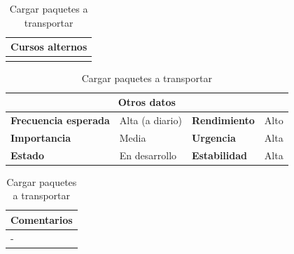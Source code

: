 \documentclass[12pt,spanish]{article}
\begin{document}
\begin{table}[H]
\vspace{1cm}

\begin{tabular}{|m{10pt}|m{7.15cm}|m{10pt}|m{7.15cm}|}
\hline
\multicolumn{4}{|m{16.2cm}|}{\textbf{Cursos alternos}} \\
\hline
\\
\hline

\end{tabular}

\vspace{1cm}

\begin{tabular}{|m{3.72cm}|m{3.72cm}|m{3.72cm}|m{3.72cm}|}
\hline
\multicolumn{4}{|c|}{\textbf{Otros datos}} \\
\hline
\textbf{Frecuencia esperada} & Alta (a diario) & \textbf{Rendimiento} & Alto \\
\hline
\textbf{Importancia} & Media & \textbf{Urgencia} & Alta \\
\hline
\textbf{Estado} & En desarrollo & \textbf{Estabilidad} & Alta \\
\hline
\end{tabular}

\vspace{1cm}

\begin{tabular}{|m{16.2cm}|}
\hline
\textbf{Comentarios} \\
\hline
- \\
\hline
\end{tabular}

\caption{Cargar paquetes a transportar}

\end{table}

\end{document}
